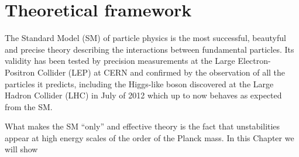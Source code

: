 \clearpage{\pagestyle{empty}\cleardoublepage}

\chapter{Theoretical framework}\label{chap:TH}

The Standard Model (SM) of particle physics is the most 
successful, beautyful and precise theory describing the interactions
between fundamental particles. Its validity has been tested by 
precision measurements at the Large Electron-Positron Collider (LEP)
at CERN and confirmed by the observation of all the particles it 
predicts, including the Higgs-like boson discovered at the
Large Hadron Collider (LHC) in July of 2012 which up to now 
behaves as expected from the SM.

What makes the SM ``only'' and effective theory is the fact 
that unstabilities appear at high energy scales of the order of the
Planck mass. In this Chapter we will show 






